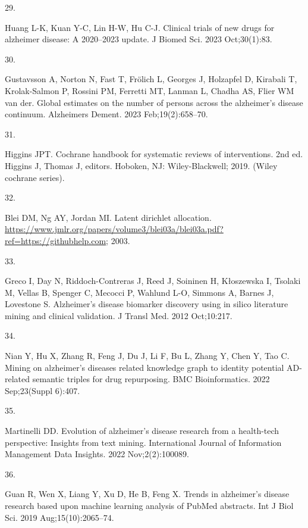 \documentclass[
  a4paper,
]{article}
\newlength{\cslhangindent}
\newlength{\csllabelwidth}
\newlength{\cslentryspacingunit} %
\newenvironment{CSLReferences}[2] %
 {%
  \setlength{\parindent}{0pt}
  \ifodd #1
  \let\oldpar\par
  \def\par{\hangindent=\cslhangindent\oldpar}
  \fi
  \setlength{\parskip}{#2\cslentryspacingunit}
 }%
 {}
\newcommand{\CSLLeftMargin}[1]{\parbox[t]{\csllabelwidth}{#1}}
\newcommand{\CSLRightInline}[1]{\parbox[t]{\linewidth - \csllabelwidth}{#1}\break}
\begin{document}
\begin{CSLReferences}{0}{0}
\leavevmode{}%
\CSLLeftMargin{29. }%
\CSLRightInline{Huang L-K, Kuan Y-C, Lin H-W, Hu C-J. Clinical trials of
new drugs for alzheimer disease: A 2020--2023 update. J Biomed Sci. 2023
Oct;30(1):83. }

\leavevmode{}%
\CSLLeftMargin{30. }%
\CSLRightInline{Gustavsson A, Norton N, Fast T, Frölich L, Georges J,
Holzapfel D, Kirabali T, Krolak-Salmon P, Rossini PM, Ferretti MT,
Lanman L, Chadha AS, Flier WM van der. Global estimates on the number of
persons across the alzheimer's disease continuum. Alzheimers Dement.
2023 Feb;19(2):658--70. }

\leavevmode{}%
\CSLLeftMargin{31. }%
\CSLRightInline{Higgins JPT. Cochrane handbook for systematic reviews of
interventions. 2nd ed. Higgins J, Thomas J, editors. Hoboken, NJ:
Wiley-Blackwell; 2019. (Wiley cochrane series). }

\leavevmode{}%
\CSLLeftMargin{32. }%
\CSLRightInline{Blei DM, Ng AY, Jordan MI. Latent dirichlet allocation.
\url{https://www.jmlr.org/papers/volume3/blei03a/blei03a.pdf?ref=https://githubhelp.com};
2003. }

\leavevmode{}%
\CSLLeftMargin{33. }%
\CSLRightInline{Greco I, Day N, Riddoch-Contreras J, Reed J, Soininen H,
Kłoszewska I, Tsolaki M, Vellas B, Spenger C, Mecocci P, Wahlund L-O,
Simmons A, Barnes J, Lovestone S. Alzheimer's disease biomarker
discovery using in silico literature mining and clinical validation. J
Transl Med. 2012 Oct;10:217. }

\leavevmode{}%
\CSLLeftMargin{34. }%
\CSLRightInline{Nian Y, Hu X, Zhang R, Feng J, Du J, Li F, Bu L, Zhang
Y, Chen Y, Tao C. Mining on alzheimer's diseases related knowledge graph
to identity potential {AD-related} semantic triples for drug
repurposing. BMC Bioinformatics. 2022 Sep;23(Suppl 6):407. }

\leavevmode{}%
\CSLLeftMargin{35. }%
\CSLRightInline{Martinelli DD. Evolution of alzheimer's disease research
from a health-tech perspective: Insights from text mining. International
Journal of Information Management Data Insights. 2022 Nov;2(2):100089. }

\leavevmode{}%
\CSLLeftMargin{36. }%
\CSLRightInline{Guan R, Wen X, Liang Y, Xu D, He B, Feng X. Trends in
alzheimer's disease research based upon machine learning analysis of
{PubMed} abstracts. Int J Biol Sci. 2019 Aug;15(10):2065--74. }


\end{CSLReferences}
\end{document}
